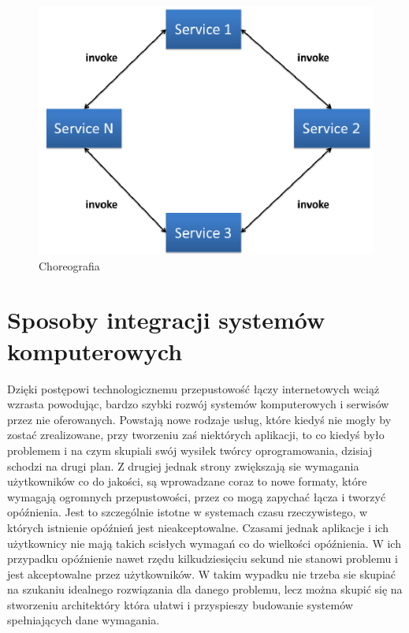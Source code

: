 \begin{figure}[!h]
	\centering
	\includegraphics[scale=0.75]{choreogragia.png} 
	\caption{Choreografia}
\end{figure}

\section{Sposoby integracji systemów komputerowych}
Dzięki postępowi technologicznemu przepustowość łączy internetowych wciąż wzrasta powodując, bardzo szybki rozwój systemów komputerowych i serwisów przez nie oferowanych. Powstają nowe rodzaje usług, które kiedyś nie mogły by zostać zrealizowane, przy tworzeniu zaś niektórych aplikacji, to co kiedyś było problemem i na czym skupiali swój wysiłek twórcy oprogramowania, dzisiaj schodzi na drugi plan. Z drugiej jednak strony zwiększają sie wymagania użytkowników co do jakości, są wprowadzane coraz to nowe formaty, które wymagają ogromnych przepustowości, przez co mogą zapychać łącza i tworzyć opóźnienia. Jest to szczególnie istotne w systemach czasu rzeczywistego, w których istnienie opóźnień jest nieakceptowalne. Czasami jednak aplikacje i ich użytkownicy nie mają takich scisłych wymagań co do wielkości opóźnienia. W ich przypadku opóźnienie nawet rzędu kilkudziesięciu sekund nie stanowi problemu i jest akceptowalne przez użytkowników. W takim wypadku nie trzeba sie skupiać na szukaniu idealnego rozwiązania dla danego problemu, lecz można skupić się na stworzeniu architektóry która ułatwi i przyspieszy budowanie systemów spełniających dane wymagania.

